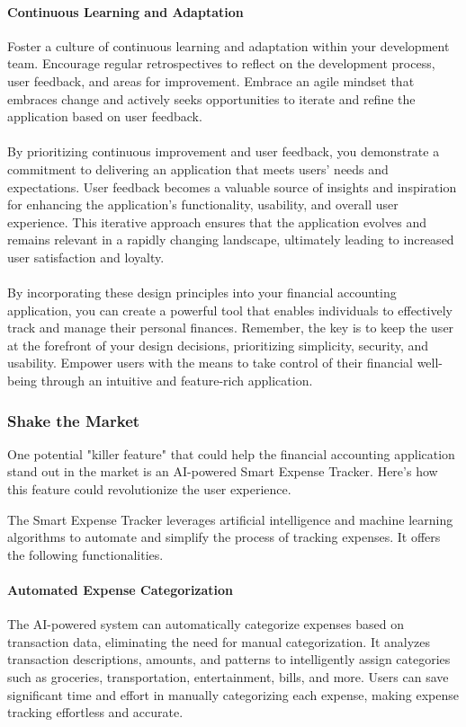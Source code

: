 \paragraph{Continuous Learning and Adaptation}
Foster a culture of continuous learning and adaptation within your development team. Encourage regular retrospectives 
to reflect on the development process, user feedback, and areas for improvement. Embrace an agile mindset that
embraces change and actively seeks opportunities to iterate and refine the application based on user feedback.
\\
\\
By prioritizing continuous improvement and user feedback, you demonstrate a commitment to delivering an application 
that meets users' needs and expectations. User feedback becomes a valuable source of insights and inspiration for 
enhancing the application's functionality, usability, and overall user experience. This iterative approach ensures 
that the application evolves and remains relevant in a rapidly changing landscape, ultimately leading to increased 
user satisfaction and loyalty.
\\
\\
By incorporating these design principles into your financial accounting application, you can create a powerful 
tool that enables individuals to effectively track and manage their personal finances. Remember, the key is to 
keep the user at the forefront of your design decisions, prioritizing simplicity, security, and usability. 
Empower users with the means to take control of their financial well-being through an intuitive and 
feature-rich application.

\subsubsection{Shake the Market}

One potential "killer feature" that could help the financial accounting application stand out in the market is 
an AI-powered Smart Expense Tracker. Here's how this feature could revolutionize the user experience.

The Smart Expense Tracker leverages artificial intelligence and machine learning algorithms to automate and 
simplify the process of tracking expenses. It offers the following functionalities.

\paragraph{Automated Expense Categorization}
The AI-powered system can automatically categorize expenses based on transaction data, eliminating the need 
for manual categorization. It analyzes transaction descriptions, amounts, and patterns to intelligently assign 
categories such as groceries, transportation, entertainment, bills, and more. Users can save significant time 
and effort in manually categorizing each expense, making expense tracking effortless and accurate.

